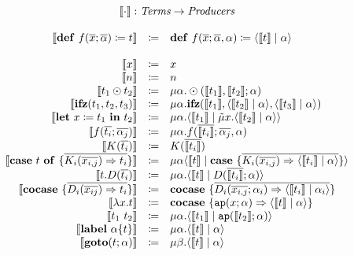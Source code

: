 \documentclass[nonacm]{acmart}
\newcommand{\translate}[1]{\ensuremath{\llbracket#1 \rrbracket}}
\newcommand{\cut}[2]{\ensuremath{\langle #1 \mid #2 \rangle}}
\newcommand{\letin}[3]{\ensuremath{\mathbf{let}\ #1 \coloneqq #2\ \mathbf{in}\ #3}}
\newcommand{\caseof}[2]{\ensuremath{\mathbf{case}\ #1\ \mathbf{of}\ \{ #2 \}}}
\begin{document}
\[
  \begin{array}{rcl}
    \multicolumn{3}{c}{\translate{\cdot} : \emph{Terms} \rightarrow \emph{Producers}}\\
    \\
    \translate{\mathbf{def}\ f(\overline{x};\overline{\alpha}) \coloneq t} & \coloneq & \mathbf{def}\ f(\overline{x};\overline{\alpha},\alpha) \coloneq \cut{\translate{t}}{\alpha}\\
  \quad \\
    \translate{x} & \coloneq & x\\
    \translate{n} & \coloneq & n\\
    \translate{t_1 \odot t_2} & \coloneq & \mu \alpha.\odot(\translate{t_1},\translate{t_2};\alpha)\\
    \translate{\mathbf{ifz}(t_1,t_2,t_3)} & \coloneq & \mu \alpha.\mathbf{ifz}(\translate{t_1},\cut{\translate{t_2}}{\alpha},\cut{\translate{t_3}}{\alpha}) \\
    \translate{\letin{x}{t_1}{t_2}} & \coloneq & \mu \alpha.\cut{\translate{t_1}}{\tilde{\mu}x.\cut{\translate{t_2}}{\alpha}}\\
    \translate{f(\overline{t_i};\overline{\alpha_j})} & \coloneq & \mu \alpha.f(\overline{\translate{t_i}};\overline{\alpha_j},\alpha)\\
    \translate{K(\overline{t_i})} & \coloneq & K(\overline{\translate{t_i}})\\
    \translate{\caseof{t}{\overline{K_i(\overline{x_{i,j}}) \Rightarrow t_i}}} & \coloneq & \mu \alpha \cut{\translate{t}}{\mathbf{case}\ \{ \overline{K_i(\overline{x_{i,j}}) \Rightarrow \cut{\translate{t_i}}{\alpha}}\}}\\
    \translate{t.D(\overline{t_i})} & \coloneq & \mu\alpha.\cut{\translate{t}}{D(\overline{\translate{t_i}};\alpha)}\\
    \translate{\mathbf{cocase}\ \{\overline{D_i(\overline{x_{ij}})\Rightarrow t_i}\}} & \coloneq & \mathbf{cocase}\ \{ \overline{D_i(\overline{x_{i,j}};\alpha_i)\Rightarrow \cut{\translate{t_i}}{\alpha_i}} \} \\
    \translate{\lambda x.t} & \coloneq & \mathbf{cocase}\ \{ \mathtt{ap}(x;\alpha) \Rightarrow \cut{\translate{t}}{\alpha}\}\\
    \translate{t_1\ t_2} & \coloneq & \mu \alpha. \cut{\translate{t_1}}{\mathtt{ap}(\translate{t_2};\alpha)}\\
    \translate{\mathbf{label}\ \alpha \{t\}} & \coloneq & \mu\alpha. \cut{\translate{t}}{\alpha}\\
    \translate{\mathbf{goto}(t;\alpha)} & \coloneq & \mu\beta.\cut{\translate{t}}{\alpha}
  \end{array}
\]
\end{document}
